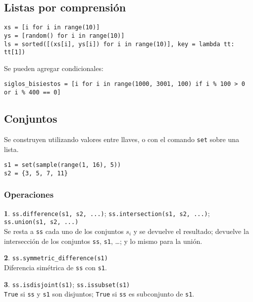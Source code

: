 \documentclass[12pt]{article}
\theoremstyle{definition}
\newtheorem{funcion}{}[section]
\begin{document}
\subsection{Listas por comprensión}
\small
\begin{verbatim}
xs = [i for i in range(10)]
ys = [random() for i in range(10)]
ls = sorted([(xs[i], ys[i]) for i in range(10)], key = lambda tt: tt[1])
\end{verbatim}
\normalsize

\noindent Se pueden agregar condicionales:
\small
\begin{verbatim}
siglos_bisiestos = [i for i in range(1000, 3001, 100) if i % 100 > 0 or i % 400 == 0]
\end{verbatim}
\normalsize

\subsection{Conjuntos}
Se construyen utilizando valores entre llaves, o con el comando \verb|set| sobre una lista.
\small
\begin{verbatim}
s1 = set(sample(range(1, 16), 5))
s2 = {3, 5, 7, 11}
\end{verbatim}
\normalsize

\subsubsection{Operaciones}
\begin{funcion}
  \verb|ss.difference(s1, s2, ...)|; \verb|ss.intersection(s1, s2, ...)|; \verb|ss.union(s1, s2, ...)| \\[1ex]
  Se resta a \verb|ss| cada uno de los conjuntos $s_i$ y se devuelve el resultado; devuelve la intersección de los conjuntos \verb|ss|, \verb|s1|, \dots; y lo mismo para la unión.
\end{funcion}

\begin{funcion}
  \verb|ss.symmetric_difference(s1)| \\[1ex]
  Diferencia simétrica de \verb|ss| con \verb|s1|.
\end{funcion}

\begin{funcion}
  \verb|ss.isdisjoint(s1)|; \verb|ss.issubset(s1)| \\[1ex]
  \verb|True| si \verb|ss| y \verb|s1| son disjuntos; \verb|True| si \verb|ss| es subconjunto de \verb|s1|.
\end{funcion}
\end{document}
